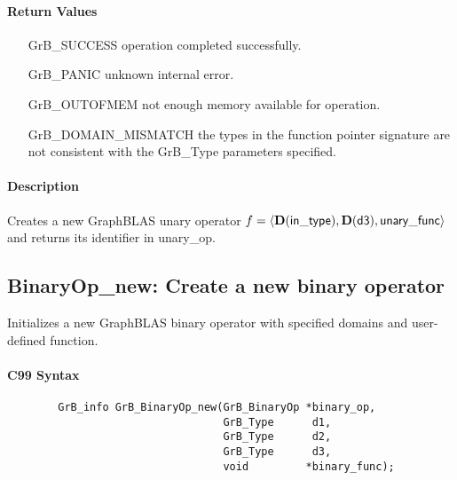 \paragraph{Return Values}

\begin{itemize}[leftmargin=2.1in]
\item[{\sf GrB\_SUCCESS}]           operation completed successfully.
\item[{\sf GrB\_PANIC}]             unknown internal error.
\item[{\sf GrB\_OUTOFMEM}]          not enough memory available for operation.
\item[{\sf GrB\_DOMAIN\_MISMATCH}]  the types in the function pointer signature are not   
                                    consistent with the {\sf GrB\_Type} parameters specified.
\end{itemize}

\paragraph{Description}

Creates a new GraphBLAS unary operator $f = \langle \bold{D}({\sf in\_type}), 
\bold{D}({\sf d3}), {\sf unary\_func} \rangle$ and returns its identifier 
in {\sf unary\_op}.




\subsection{{\sf BinaryOp\_new}: Create a new binary operator}

Initializes a new GraphBLAS binary operator with specified domains and user-defined function.

\paragraph{C99 Syntax}

\begin{verbatim}
        GrB_info GrB_BinaryOp_new(GrB_BinaryOp *binary_op,
                                  GrB_Type      d1,
                                  GrB_Type      d2,
                                  GrB_Type      d3,
                                  void         *binary_func);
\end{verbatim}

